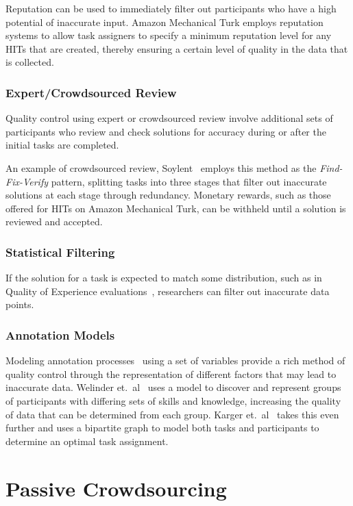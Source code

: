 \documentclass[10pt,twocolumn]{article}
\begin{document}
Reputation can be used to immediately filter out participants who have a 
high potential of inaccurate input. Amazon Mechanical Turk employs
reputation systems to allow task assigners to specify a minimum reputation 
level for any HITs that are created, thereby ensuring a certain level
of quality in the data that is collected.


\subsubsection*{Expert/Crowdsourced Review}
Quality control using expert or crowdsourced review involve additional
sets of participants who review and check solutions for accuracy during 
or after the initial tasks are completed.

An example of crowdsourced review, Soylent~\cite{Bernstein2010} employs 
this method as the \textit{Find-Fix-Verify} pattern, splitting tasks 
into three stages that filter out inaccurate solutions at each stage 
through redundancy. Monetary rewards, such as those offered for
HITs on Amazon Mechanical Turk, can be withheld until a solution
is reviewed and accepted.


\subsubsection*{Statistical Filtering}
If the solution for a task is expected to match some distribution, 
such as in Quality of Experience evaluations~\cite{Chen2009}, researchers 
can filter out inaccurate data points.


\subsubsection*{Annotation Models}
Modeling annotation processes~\cite{Karger,Welinder} using a set of variables 
provide a rich method of quality control through the representation of 
different factors that may lead to inaccurate data. Welinder et.\ 
al~\cite{Welinder} uses a model to discover and represent groups of 
participants with differing sets of skills and knowledge, increasing the 
quality of data that can be determined from each group. Karger et.\ 
al~\cite{Karger} takes this even further and uses a bipartite graph to model 
both tasks and participants to determine an optimal task assignment.


\section{Passive Crowdsourcing}
\label{sec:passive}
\end{document}
